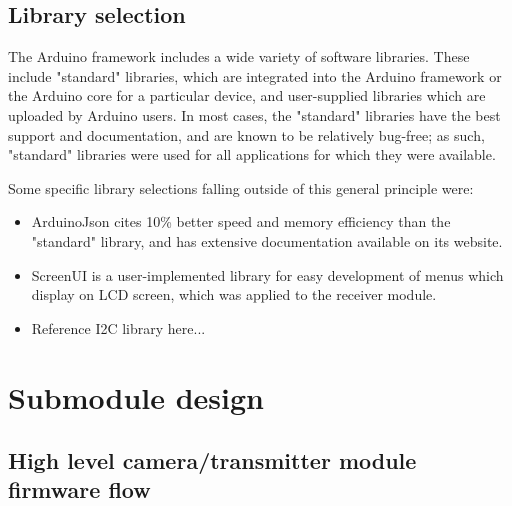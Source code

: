 \subsection{Library selection}

The Arduino framework includes a wide variety of software libraries. These include "standard" libraries, which are integrated into the Arduino framework or the Arduino core for a particular device, and user-supplied libraries which are uploaded by Arduino users. In most cases, the "standard" libraries have the best support and documentation, and are known to be relatively bug-free; as such, "standard" libraries were used for all applications for which they were available.

Some specific library selections falling outside of this general principle were:

\begin{itemize}
    \item ArduinoJson \cite{Arduino JSON citation} cites 10\% better speed and memory efficiency than the "standard" library, and has extensive documentation available on its website.
    \item ScreenUI \cite{Screen UI library here} is a user-implemented library for easy development of menus which display on LCD screen, which was applied to the receiver module.
    \item Reference I2C library here...
\end{itemize}



\section{Submodule design \label{s:firmware-desing-process}}

\subsection{High level camera/transmitter module firmware flow}

